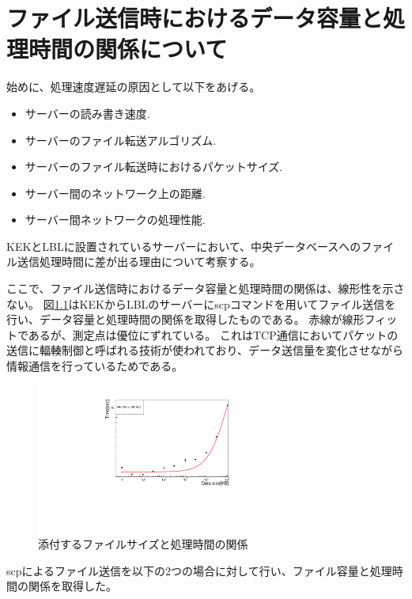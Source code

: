 \chapter{ファイル送信時におけるデータ容量と処理時間の関係について} \label{chap:data_time_detail}

始めに、処理速度遅延の原因として以下をあげる。
\begin{itemize}
  \item サーバーの読み書き速度.
  \item サーバーのファイル転送アルゴリズム.
  \item サーバーのファイル転送時におけるパケットサイズ.
  \item サーバー間のネットワーク上の距離.
  \item サーバー間ネットワークの処理性能.
\end{itemize}

KEKとLBLに設置されているサーバーにおいて、中央データベースへのファイル送信処理時間に差が出る理由について考察する。

ここで、ファイル送信時におけるデータ容量と処理時間の関係は、線形性を示さない。
図\ref{datasize_vs_time_scp}はKEKからLBLのサーバーにscpコマンドを用いてファイル送信を行い、データ容量と処理時間の関係を取得したものである。
赤線が線形フィットであるが、測定点は優位にずれている。
これはTCP通信においてパケットの送信に輻輳制御\cite{e-1}と呼ばれる技術が使われており、データ送信量を変化させながら情報通信を行っているためである。

\begin{figure}[bpt]\centering
  \begin{center}
    \includegraphics[width=7cm,angle=270]{./datasize_vs_time_scp.pdf}
  \caption[添付するファイルサイズと処理時間の関係]{添付するファイルサイズと処理時間の関係}
  \label{datasize_vs_time_scp}
  \end{center}
\end{figure}

scpによるファイル送信を以下の2つの場合に対して行い、ファイル容量と処理時間の関係を取得した。

